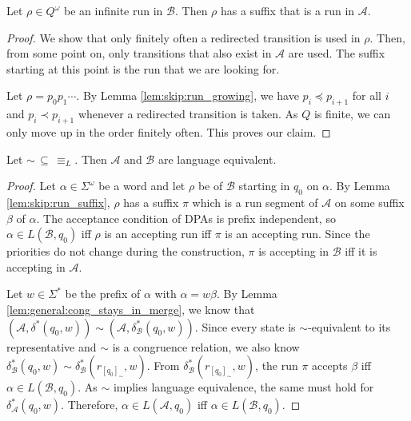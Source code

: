 \begin{lem}
\label{lem:skip:run_suffix}
	Let $\rho \in Q^\omega$ be an infinite run in $\mathcal{B}$. Then $\rho$ has a suffix that is a run in $\mathcal{A}$.
\end{lem} 

\begin{proof}
	We show that only finitely often a redirected transition is used in $\rho$. Then, from some point on, only transitions that also exist in $\mathcal{A}$ are used. The suffix starting at this point is the run that we are looking for.
	
	Let $\rho = p_0 p_1 \cdots$. By Lemma \ref{lem:skip:run_growing}, we have $p_i \preceq p_{i+1}$ for all $i$ and $p_i \prec p_{i+1}$ whenever a redirected transition is taken. As $Q$ is finite, we can only move up in the order finitely often. This proves our claim.
\end{proof}


\begin{theorem}
	Let $\sim \,\subseteq\, \equiv_L$. Then $\mathcal{A}$ and $\mathcal{B}$ are language equivalent.
\label{thm:skip:lang_equiv}
\end{theorem}

\begin{proof}
	Let $\alpha \in \Sigma^\omega$ be a word and let $\rho$ be of $\mathcal{B}$ starting in $q_0$ on $\alpha$. By Lemma \ref{lem:skip:run_suffix}, $\rho$ has a suffix $\pi$ which is a run segment of $\mathcal{A}$ on some suffix $\beta$ of $\alpha$. The acceptance condition of DPAs is prefix independent, so $\alpha \in L(\mathcal{B}, q_0)$ iff $\rho$ is an accepting run iff $\pi$ is an accepting run. Since the priorities do not change during the construction, $\pi$ is accepting in $\mathcal{B}$ iff it is accepting in $\mathcal{A}$.
	
	Let $w \in \Sigma^*$ be the prefix of $\alpha$ with $\alpha = w \beta$. By Lemma \ref{lem:general:cong_stays_in_merge}, we know that \linebreak
$(\mathcal{A}, \delta^*(q_0, w)) \sim (\mathcal{A}, \delta^*_\mathcal{B}(q_0, w))$. Since every state is $\sim$-equivalent to its representative and $\sim$ is a congruence relation, we also know $\delta^*_\mathcal{B}(q_0, w) \sim \delta^*_\mathcal{B}(r_{[q_0]_\sim}, w)$. From $\delta^*_\mathcal{B}(r_{[q_0]_\sim}, w)$, the run $\pi$ accepts $\beta$ iff $\alpha \in L(\mathcal{B}, q_0)$. As $\sim$ implies language equivalence, the same must hold for $\delta^*_\mathcal{A}(q_0, w)$. Therefore, $\alpha \in L(\mathcal{A}, q_0)$ iff $\alpha \in L(\mathcal{B}, q_0)$.
\end{proof}




